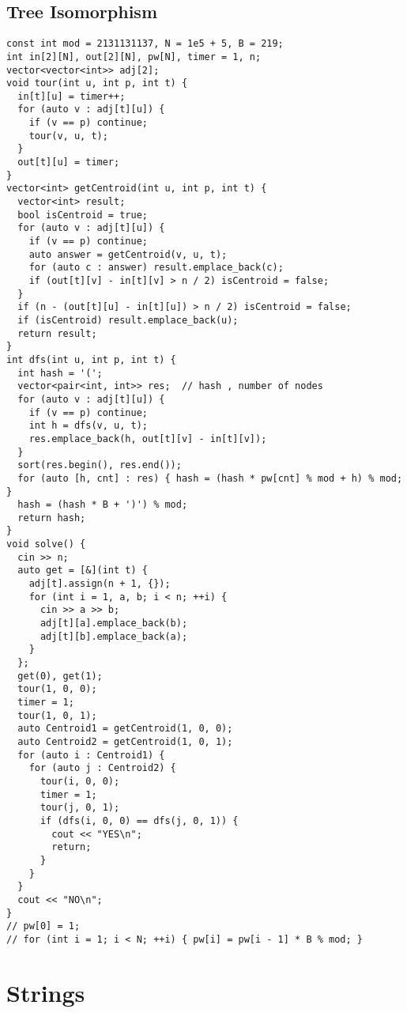 \documentclass[twoside]{article}
\begin{document}
\begin{multicols*}{2}
{\subsection*{Tree Isomorphism}
}
\begin{verbatim}
const int mod = 2131131137, N = 1e5 + 5, B = 219;
int in[2][N], out[2][N], pw[N], timer = 1, n;
vector<vector<int>> adj[2];
void tour(int u, int p, int t) {
  in[t][u] = timer++;
  for (auto v : adj[t][u]) {
    if (v == p) continue;
    tour(v, u, t);
  }
  out[t][u] = timer;
}
vector<int> getCentroid(int u, int p, int t) {
  vector<int> result;
  bool isCentroid = true;
  for (auto v : adj[t][u]) {
    if (v == p) continue;
    auto answer = getCentroid(v, u, t);
    for (auto c : answer) result.emplace_back(c);
    if (out[t][v] - in[t][v] > n / 2) isCentroid = false;
  }
  if (n - (out[t][u] - in[t][u]) > n / 2) isCentroid = false;
  if (isCentroid) result.emplace_back(u);
  return result;
}
int dfs(int u, int p, int t) {
  int hash = '(';
  vector<pair<int, int>> res;  // hash , number of nodes
  for (auto v : adj[t][u]) {
    if (v == p) continue;
    int h = dfs(v, u, t);
    res.emplace_back(h, out[t][v] - in[t][v]);
  }
  sort(res.begin(), res.end());
  for (auto [h, cnt] : res) { hash = (hash * pw[cnt] % mod + h) % mod; }
  hash = (hash * B + ')') % mod;
  return hash;
}
void solve() {
  cin >> n;
  auto get = [&](int t) {
    adj[t].assign(n + 1, {});
    for (int i = 1, a, b; i < n; ++i) {
      cin >> a >> b;
      adj[t][a].emplace_back(b);
      adj[t][b].emplace_back(a);
    }
  };
  get(0), get(1);
  tour(1, 0, 0);
  timer = 1;
  tour(1, 0, 1);
  auto Centroid1 = getCentroid(1, 0, 0);
  auto Centroid2 = getCentroid(1, 0, 1);
  for (auto i : Centroid1) {
    for (auto j : Centroid2) {
      tour(i, 0, 0);
      timer = 1;
      tour(j, 0, 1);
      if (dfs(i, 0, 0) == dfs(j, 0, 1)) {
        cout << "YES\n";
        return;
      }
    }
  }
  cout << "NO\n";
}
// pw[0] = 1;
// for (int i = 1; i < N; ++i) { pw[i] = pw[i - 1] * B % mod; }
\end{verbatim}

{
\section*{Strings}
}
{
}
\end{multicols*}
\end{document}
